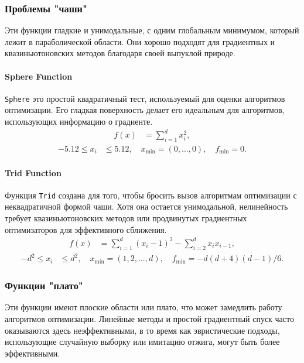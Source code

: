 \documentclass[10pt]{article}
\begin{document}
\subsubsection{Проблемы "чаши"}
Эти функции гладкие и унимодальные, с одним глобальным минимумом, который лежит в параболической области. Они хорошо подходят для градиентных и квазиньютоновских методов благодаря своей выпуклой природе.

\paragraph{Sphere Function}
\texttt{Sphere} это простой квадратичный тест, используемый для оценки алгоритмов оптимизации. Его гладкая поверхность делает его идеальным для алгоритмов, использующих информацию о градиенте.
\begin{align}
    f(x) &= \sum_{i=1}^d x_i^2,
    \label{eq:sphere}
\end{align}
\begin{align*}
    -5.12 \leq x_i &\leq 5.12, \quad x_{\text{min}} = (0, \ldots, 0), \quad f_{\text{min}} = 0.
\end{align*}

\paragraph{Trid Function}
Функция \texttt{Trid} создана для того, чтобы бросить вызов алгоритмам оптимизации с неквадратичной формой чаши. Хотя она остается унимодальной, нелинейность требует квазиньютоновских методов или продвинутых градиентных оптимизаторов для эффективного сближения.
\begin{align}
    f(x) &= \sum_{i=1}^d (x_i - 1)^2 - \sum_{i=2}^d x_i x_{i-1},
    \label{eq:trid}
\end{align}
\begin{align*}
    -d^2 \leq x_i &\leq d^2, \quad x_{\text{min}} = \left(1, 2, \ldots, d\right), \quad f_{\text{min}} = -d(d+4)(d-1)/6.
\end{align*}

\subsubsection{Функции "плато"}
Эти функции имеют плоские области или плато, что может замедлить работу алгоритмов оптимизации. Линейные методы и простой градиентный спуск часто оказываются здесь неэффективными, в то время как эвристические подходы, использующие случайную выборку или имитацию отжига, могут быть более эффективными.
\end{document}

